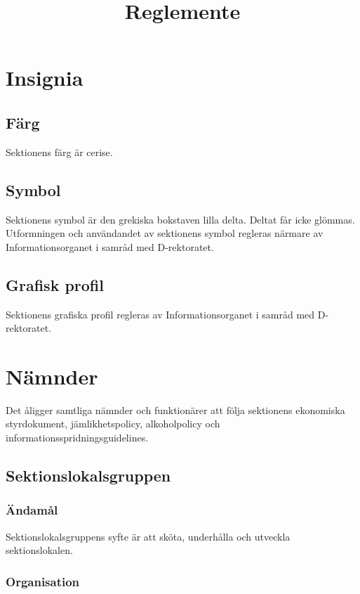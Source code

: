 \documentclass{dgovdoc}
\title{Reglemente}
\begin{document}
\maketitle

\section{Insignia}

\subsection{Färg}

Sektionens färg är cerise.

\subsection{Symbol}

Sektionens symbol är den grekiska bokstaven lilla delta. Deltat får icke glömmas. Utformningen och användandet av sektionens symbol regleras närmare av Informationsorganet i samråd med D-rektoratet.

\subsection{Grafisk profil}

Sektionens grafiska profil regleras av Informationsorganet i samråd med D-rektoratet.

\section{Nämnder}

Det åligger samtliga nämnder och funktionärer att följa sektionens ekonomiska styrdokument, jämlikhetspolicy, alkoholpolicy och informationsspridningsguidelines.

\subsection{Sektionslokalsgruppen}

\subsubsection{Ändamål}

Sektionslokalsgruppens syfte är att sköta, underhålla och utveckla sektionslokalen.

\subsubsection{Organisation}
\end{document}
